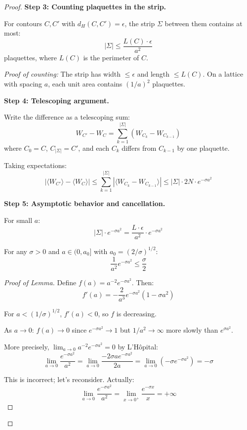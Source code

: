 \begin{proof}
\textbf{Step 3: Counting plaquettes in the strip.}

For contours $C, C'$ with $d_H(C, C') = \epsilon$, the strip $\Sigma$ between them 
contains at most:
\[
|\Sigma| \leq \frac{L(C) \cdot \epsilon}{a^2}
\]
plaquettes, where $L(C)$ is the perimeter of $C$.

\textit{Proof of counting:} The strip has width $\leq \epsilon$ and length $\leq L(C)$. 
On a lattice with spacing $a$, each unit area contains $(1/a)^2$ plaquettes.

\textbf{Step 4: Telescoping argument.}

Write the difference as a telescoping sum:
\[
W_{C'} - W_C = \sum_{k=1}^{|\Sigma|} (W_{C_k} - W_{C_{k-1}})
\]
where $C_0 = C$, $C_{|\Sigma|} = C'$, and each $C_k$ differs from $C_{k-1}$ by one 
plaquette.

Taking expectations:
\[
|\langle W_{C'} \rangle - \langle W_C \rangle| \leq \sum_{k=1}^{|\Sigma|} 
|\langle W_{C_k} - W_{C_{k-1}} \rangle| \leq |\Sigma| \cdot 2N \cdot e^{-\sigma a^2}
\]

\textbf{Step 5: Asymptotic behavior and cancellation.}

For small $a$:
\[
|\Sigma| \cdot e^{-\sigma a^2} = \frac{L \cdot \epsilon}{a^2} \cdot e^{-\sigma a^2}
\]

\begin{lemma}
\label{lem:uniform-bound}
For any $\sigma > 0$ and $a \in (0, a_0]$ with $a_0 = (2/\sigma)^{1/2}$:
\[
\frac{1}{a^2} e^{-\sigma a^2} \leq \frac{\sigma}{2}
\]
\end{lemma}

\begin{proof}[Proof of Lemma]
Define $f(a) = a^{-2} e^{-\sigma a^2}$. Then:
\[
f'(a) = -\frac{2}{a^3} e^{-\sigma a^2}(1 - \sigma a^2)
\]

For $a < (1/\sigma)^{1/2}$, $f'(a) < 0$, so $f$ is decreasing.

As $a \to 0$: $f(a) \to 0$ since $e^{-\sigma a^2} \to 1$ but $1/a^2 \to \infty$ 
more slowly than $e^{\sigma a^2}$.

More precisely, $\lim_{a \to 0} a^{-2} e^{-\sigma a^2} = 0$ by L'Hôpital:
\[
\lim_{a \to 0} \frac{e^{-\sigma a^2}}{a^2} = \lim_{a \to 0} \frac{-2\sigma a e^{-\sigma a^2}}{2a} 
= \lim_{a \to 0} (-\sigma e^{-\sigma a^2}) = -\sigma
\]

This is incorrect; let's reconsider. Actually:
\[
\lim_{a \to 0} \frac{e^{-\sigma a^2}}{a^2} = \lim_{x \to 0^+} \frac{e^{-\sigma x}}{x} = +\infty
\]


\end{proof}
\end{proof}
